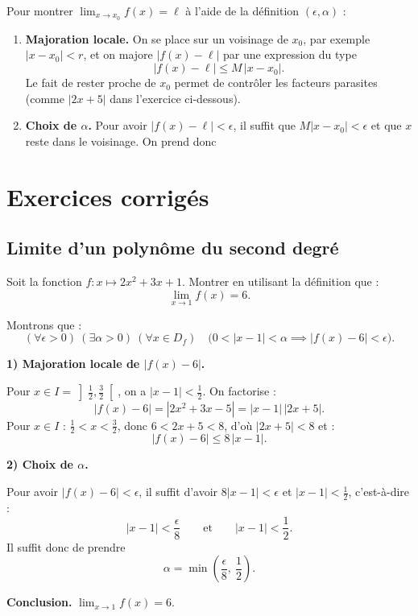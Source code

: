 \documentclass[11pt,class=report,crop=false]{standalone}
\begin{document}
Pour montrer $\displaystyle\lim_{x\to x_0} f(x)=\ell$ à l'aide de la définition $(\epsilon,\alpha)$ :
\begin{enumerate}
  \item \textbf{Majoration locale.} On se place sur un voisinage de $x_0$, par exemple $|x-x_0|<r$, et on majore $|f(x)-\ell|$ par une expression du type
  $$|f(x)-\ell| \le M\,|x-x_0|.$$
  Le fait de rester proche de $x_0$ permet de contrôler les facteurs parasites (comme $|2x+5|$ dans l'exercice ci-dessous).

  \item \textbf{Choix de $\alpha$.} Pour avoir $|f(x)-\ell|<\epsilon$, il suffit que $M|x-x_0|<\epsilon$ et que $x$ reste dans le voisinage. On prend donc
\end{enumerate}



\section{Exercices corrigés}

\subsection{Limite d'un polynôme du second degré}

\begin{exercicecours}
Soit la fonction $f : x \mapsto 2x^2+3x+1$.
Montrer en utilisant la définition que :
$$\lim_{x\to 1} f(x) = 6.$$
\end{exercicecours}

\begin{solution}
Montrons que :
$$(\forall \epsilon>0)\ (\exists \alpha>0)\ (\forall x\in D_f)\quad \big(0<|x-1|<\alpha \implies |f(x)-6|<\epsilon\big).$$

\textbf{1) Majoration locale de $|f(x)-6|$.}

Pour $x\in I=\left]\frac12,\frac32\right[$, on a $|x-1|<\frac12$. On factorise :
$$|f(x)-6| = |2x^2+3x-5| = |x-1|\,|2x+5|.$$
Pour $x\in I$ : $\frac12<x<\frac32$, donc $6<2x+5<8$, d'où $|2x+5|<8$ et :
$$|f(x)-6| \le 8\,|x-1|.$$

\textbf{2) Choix de $\alpha$.}

Pour avoir $|f(x)-6|<\epsilon$, il suffit d'avoir $8|x-1|<\epsilon$ et $|x-1|<\frac12$, c'est-à-dire :
$$|x-1|<\frac{\epsilon}{8} \qquad\text{et}\qquad |x-1|<\frac12.$$
Il suffit donc de prendre
$$\alpha=\min\left(\frac{\epsilon}{8},\ \frac12\right).$$

\textbf{Conclusion.} $\displaystyle\lim_{x\to 1} f(x) = 6$.
\end{solution}
\end{document}
